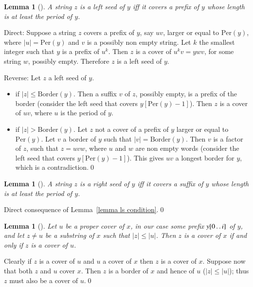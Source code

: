 \documentclass[preprint,12pt]{elsarticle}
\newcommand{\dd}{\mathinner{\ldotp\ldotp}}
\newcommand{\Border}[1]{\ensuremath{\mathrm{Border}(#1)}}
\newcommand{\Per}[1]{\ensuremath{\mathrm{Per}(#1)}}
\newtheorem{lemma}[theorem]{Lemma}
\newenvironment{proof}[1][Proof]{\begin{trivlist}
\item[\hskip \labelsep {\bfseries #1}]}{\end{trivlist}}
\begin{document}
\begin{lemma}[\cite{cpm_2011}]
\label{lem:1}
A string $z$ is a left seed of $y$ iff it covers a prefix of $y$ whose length is at least the period of $y$.
\label{lemma ls condition}
\end{lemma}
\begin{proof}
Direct: Suppose a string $z$ covers a prefix of $y$, say $uv$, larger or equal to $\Per{y}$, where $|u|=\Per{y}$ and $v$ is
a possibly non empty string. Let $k$ the smallest integer such that $y$ is a prefix of $u^{k}$. 
Then $z$ is a cover of $u^{k}v=ywv$, for some string $w$, possibly empty. Therefore $z$ is a left seed of $y$.

\noindent Reverse: Let $z$ a left seed of $y$.
\begin{itemize}
 \item if $|z|\leq \Border{y}$. Then a suffix $v$ of $z$, possibly empty, is a prefix of the border (consider the left seed that covers 
 $y[\Per{y}-1]$). Then $z$ is a cover of $uv$, where $u$ is the period of $y$.
 \item if $|z| > \Border{y}$. Let $z$ not a cover of a prefix of $y$ larger or equal to $\Per{y}$.
Let $v$ a border of $y$ such that $|v| = \Border{y}$. Then $v$ is a factor of $z$, such that $z=uvw$, where $u$ and $w$
are non empty words (consider the left seed that covers $y[\Per{y}-1]$). This gives $uv$ a longest border for $y$, which is a contradiction.\qed
\end{itemize}
\end{proof}

\begin{lemma}[\cite{COCOON_2011}]
A string $z$ is a right seed of $y$ iff it covers a suffix of $y$ whose length is at least the period of $y$.
\label{lemma rs condition}
\end{lemma}
\begin{proof}
Direct consequence of Lemma~\ref{lemma ls condition}.\qed
\end{proof}

\begin{lemma}[\cite{moore1994optimal}]
Let $u$ be a proper cover of $x$, in our case some prefix $y[0\dd i]$ of $y$, and let $z\neq u$ be a substring of $x$ such that $|z|\leq |u|$. 
Then $z$ is a cover of $x$ if and only if $z$ is a cover of $u$.
\label{lemma cover of a cover}
\end{lemma}
\begin{proof}
Clearly if $z$ is a cover of $u$ and $u$ a cover of $x$ then $z$ is a cover of $x$. 
Suppose now that both $z$ and $u$ cover $x$. Then $z$ is a border of $x$ and hence of $u$ ($|z|\leq |u|$); 
thus $z$ must also be a cover of $u$.\qed
\end{proof}
\end{document}
